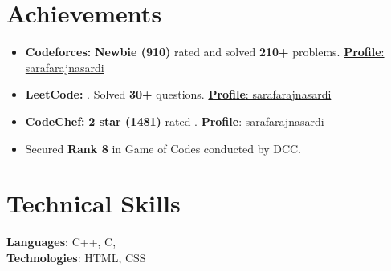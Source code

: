 \documentclass[letterpaper,11pt]{article}
\newcommand{\resumeItem}[1]{
  \item\small{
    {#1 \vspace{-2pt}}
  }
}
\newcommand{\resumeItemListStart}{\begin{itemize}}
\newcommand{\resumeItemListEnd}{\end{itemize}\vspace{-5pt}}
\begin{document}
\section{Achievements}
\resumeItemListStart
\resumeItem {\textbf{Codeforces:} \textbf{Newbie (910)} rated and solved \textbf{210+} problems.
     \href{https://codeforces.com/profile/sarafarajnasardi}
     {\textbf{Profile}: \color{blue}sarafarajnasardi}}

     \resumeItem {\textbf{LeetCode:} . Solved}\textbf{30+} questions. 
     \href{https://leetcode.com/u/Sarafaraj/}
     {\textbf{Profile}: \color{blue} sarafarajnasardi}
     
    \resumeItem {\textbf{CodeChef:} \textbf{2 star (1481)} rated .
     \href{https://www.codechef.com/users/sarafarajn}
    {\textbf{Profile}: \color{blue} sarafarajnasardi}}
        
    \resumeItem{Secured \textbf{Rank 8} in Game of Codes conducted by DCC.}
 
    
    
  
 
\resumeItemListEnd
 \vspace{-8pt}
%
\section{Technical Skills}
 \begin{itemize}[leftmargin=0.15in, label={}]
    \small{\item{
     \textbf{Languages}{: C++, C,} \\
     \textbf{Technologies}{: HTML, CSS} \\
     
    }}
 \end{itemize}
 \vspace{-12pt}
\end{document}
